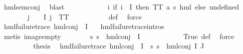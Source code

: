 \begin{isabellebody}
\ hml{\isacharunderscore}{\kern0pt}sem{\isacharunderscore}{\kern0pt}conj\ \isamarkupfalse%
\ blast\isanewline
\ \ \ \ \ \ \isamarkupfalse%
\ {\isasymPsi}\ \ {\isachardoublequoteopen}{\isasymPsi}\ {\isasymequiv}\ {\isacharparenleft}{\kern0pt}{\isasymlambda}i{\isachardot}{\kern0pt}\ {\isacharparenleft}{\kern0pt}if\ i\ {\isasymin}\ I\ then\ TT{\isacharcolon}{\kern0pt}{\isacharcolon}{\kern0pt}\ {\isacharparenleft}{\kern0pt}{\isacharprime}{\kern0pt}a{\isacharcomma}{\kern0pt}\ {\isacharprime}{\kern0pt}s{\isacharparenright}{\kern0pt}\ hml\ else\ undefined{\isacharparenright}{\kern0pt}{\isacharparenright}{\kern0pt}{\isachardoublequoteclose}\isanewline
\ \ \ \ \ \ \isamarkupfalse%
\ {\isachardoublequoteopen}{\isasymforall}j\ {\isasymin}\ {\isasymPsi}\ {\isacharbackquote}{\kern0pt}\ I{\isachardot}{\kern0pt}\ j\ {\isacharequal}{\kern0pt}\ TT{\isachardoublequoteclose}\ \isanewline
\ \ \ \ \ \ \ \ \isamarkupfalse%
\ {\isasymPsi}{\isacharunderscore}{\kern0pt}def\ \isamarkupfalse%
\ force\isanewline
\ \ \ \ \ \ \isamarkupfalse%
\ {\isachardoublequoteopen}hml{\isacharunderscore}{\kern0pt}failure{\isacharunderscore}{\kern0pt}trace\ {\isacharparenleft}{\kern0pt}hml{\isacharunderscore}{\kern0pt}conj\ {\isacharbraceleft}{\kern0pt}{\isacharbraceright}{\kern0pt}\ I\ {\isasymPsi}{\isacharparenright}{\kern0pt}{\isachardoublequoteclose}\ \isamarkupfalse%
\ hml{\isacharunderscore}{\kern0pt}failure{\isacharunderscore}{\kern0pt}trace{\isachardot}{\kern0pt}intros{\isacharparenleft}{\kern0pt}{}{\isacharparenright}{\kern0pt}\isanewline
\ \ \ \ \ \ \ \ \isamarkupfalse%
\ {\isacharparenleft}{\kern0pt}metis\ image{\isacharunderscore}{\kern0pt}empty{\isacharparenright}{\kern0pt}\isanewline
\ \ \ \ \ \ \isamarkupfalse%
\ {\isachardoublequoteopen}{\isasymforall}s{\isachardot}{\kern0pt}\ {\isacharparenleft}{\kern0pt}{\isasymnot}{\isacharparenleft}{\kern0pt}s\ {\isasymTurnstile}\ hml{\isacharunderscore}{\kern0pt}conj\ {\isacharbraceleft}{\kern0pt}{\isacharbraceright}{\kern0pt}\ I\ {\isasymPsi}{\isacharparenright}{\kern0pt}{\isacharparenright}{\kern0pt}{\isachardoublequoteclose}\ \isanewline
\ \ \ \ \ \ \ \ \isamarkupfalse%
\ True\ {\isasymPsi}{\isacharunderscore}{\kern0pt}def\ \isamarkupfalse%
\ force\isanewline
\ \ \ \ \ \ \isamarkupfalse%
\ \isamarkupfalse%
\ {\isacharquery}{\kern0pt}thesis\ \isamarkupfalse%
\ {\isacartoucheopen}hml{\isacharunderscore}{\kern0pt}failure{\isacharunderscore}{\kern0pt}trace\ {\isacharparenleft}{\kern0pt}hml{\isacharunderscore}{\kern0pt}conj\ {\isacharbraceleft}{\kern0pt}{\isacharbraceright}{\kern0pt}\ I\ {\isasymPsi}{\isacharparenright}{\kern0pt}{\isacartoucheclose}\ {\isacartoucheopen}{\isasymforall}s{\isachardot}{\kern0pt}\ {\isacharparenleft}{\kern0pt}{\isasymnot}{\isacharparenleft}{\kern0pt}s\ {\isasymTurnstile}\ hml{\isacharunderscore}{\kern0pt}conj\ I\ J\ {\isasymPhi}{\isacharparenright}{\kern0pt}{\isacharparenright}{\kern0pt}{\isacartoucheclose}\isanewline

\end{isabellebody}
